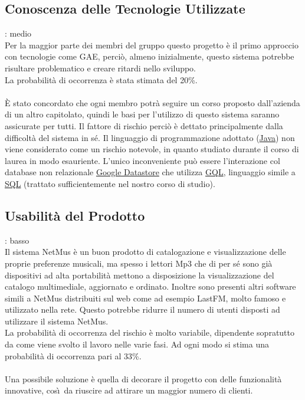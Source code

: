 \subsection{Conoscenza delle Tecnologie Utilizzate}
: medio\\
Per la maggior parte dei membri del gruppo questo progetto \`e il primo approccio con tecnologie come GAE, 
perci\`o, almeno inizialmente, questo sistema potrebbe risultare problematico e
creare ritardi nello sviluppo.\\
La probabilit\`a di occorrenza \`e stata stimata del 20\%.\\
\\ 
\`E stato concordato che ogni membro potr\`a seguire un corso proposto
  dall'azienda di un altro capitolato, quindi le basi per l'utilizzo di questo
  sistema saranno assicurate per tutti. Il fattore di rischio perci\`o \`e
  dettato principalmente dalla difficolt\`a del sistema in s\'e. Il linguaggio
  di programmazione adottato (\underline{Java}) non viene considerato come un
  rischio notevole, in quanto studiato durante il corso di laurea in modo
  esauriente. L'unico inconveniente pu\`o essere l'interazione col
  database non relazionale \underline{Google Datastore} che utilizza \underline{GQL}, linguaggio simile a
  \underline{SQL} (trattato sufficientemente nel nostro corso di studio).

\subsection{Usabilit\`a del Prodotto}
: basso\\
Il sistema NetMus \`e un buon prodotto di catalogazione e visualizzazione delle
proprie preferenze musicali, ma spesso i lettori Mp3 che di per s\'e sono gi\`a
dispositivi ad alta portabilit\`a mettono a disposizione la visualizzazione del
catalogo multimediale, aggiornato e ordinato. Inoltre sono presenti altri
software simili a NetMus distribuiti sul web come ad esempio LastFM, molto
famoso e utilizzato nella rete. Questo potrebbe ridurre il numero di utenti disposti
ad utilizzare il sistema NetMus.\\
La probabilit\`a di occorrenza del rischio \`e molto variabile, dipendente
sopratutto da come viene svolto il lavoro nelle varie fasi. Ad ogni modo si
stima una probabilit\`a di occorrenza pari al 33\%.\\
\\
Una possibile soluzione \`e quella di decorare il progetto con delle
funzionalit\`a innovative, cos\`\i\ da riuscire ad attirare un maggior numero di clienti.

